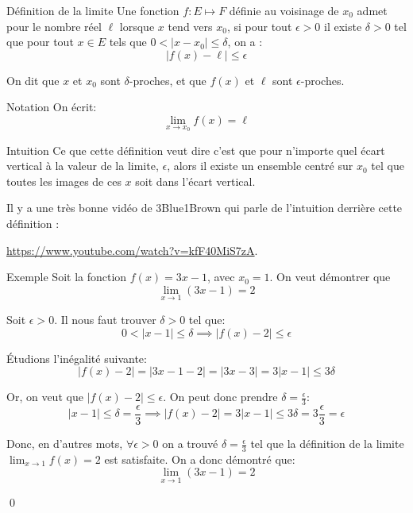 \documentclass[a4paper]{article}
\begin{document}
\begin{parag}{Définition de la limite}
        Une fonction $f: E \mapsto F$ définie au voisinage de $x_0$ admet pour  le nombre réel $\ell$ lorsque $x$ tend vers $x_0$, si pour tout $\epsilon > 0$ il existe $\delta > 0$ tel que pour tout $x \in E$ tels que $0 < \left|x - x_0\right| \leq \delta$, on a :
        \[\left|f\left(x\right) - \ell\right| \leq \epsilon\]

        On dit que $x$ et $x_0$ sont $\delta$-proches, et que $f\left(x\right)$ et $\ell$ sont $\epsilon$-proches.

    \begin{subparag}{Notation}
            On écrit:
            \[\lim_{x \to x_0} f\left(x\right) = \ell\]
    \end{subparag}

    \begin{subparag}{Intuition}
            Ce que cette définition veut dire c'est que pour n'importe quel écart vertical à la valeur de la limite, $\epsilon$, alors il existe un ensemble centré sur $x_0$ tel que toutes les images de ces $x$ soit dans l'écart vertical.


            Il y a une très bonne vidéo de 3Blue1Brown qui parle de l'intuition derrière cette définition :
            \begin{center}
                \url{https://www.youtube.com/watch?v=kfF40MiS7zA}.
            \end{center}
    \end{subparag}
\end{parag}

\begin{parag}{Exemple}
        Soit la fonction $f\left(x\right) = 3x - 1$, avec $x_0 = 1$. On veut démontrer que
        \[\lim_{x \to 1} \left(3x - 1\right) = 2\]

        Soit $\epsilon > 0$. Il nous faut trouver $\delta > 0$ tel que:
        \[0 < \left|x - 1\right| \leq \delta \implies \left|f\left(x\right) - 2\right| \leq \epsilon\]

        Étudions l'inégalité suivante:
        \[\left|f\left(x\right) - 2\right| = \left|3x - 1 - 2\right| = \left|3x - 3\right| = 3\left|x -  1\right| \leq 3\delta\]

        Or, on veut que $\left|f\left(x\right) - 2\right| \leq \epsilon$. On peut donc prendre $\delta = \frac{\epsilon}{3}$:
        \[\left|x - 1\right| \leq \delta = \frac{\epsilon}{3} \implies \left|f\left(x\right) - 2\right| = 3\left|x - 1\right| \leq 3\delta = 3 \frac{\epsilon}{3} = \epsilon\]

        Donc, en d'autres mots, $\forall \epsilon > 0$ on a trouvé $\delta = \frac{\epsilon}{3}$ tel que la définition de la limite $\lim_{x \to 1} f\left(x\right) = 2$ est satisfaite. On a donc démontré que:
        \[\lim_{x \to 1} \left(3x - 1\right) = 2\]

        \qed

\end{parag}
\end{document}
